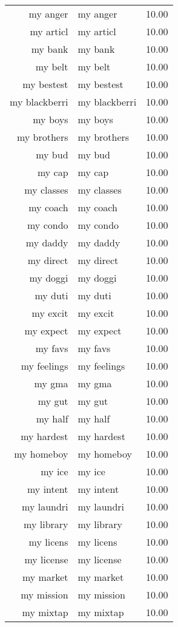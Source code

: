\begin{table}[ht]
\begin{tabular}{rlr}
  my anger & my anger & 10.00 \\ 
  my articl & my articl & 10.00 \\ 
  my bank & my bank & 10.00 \\ 
  my belt & my belt & 10.00 \\ 
  my bestest & my bestest & 10.00 \\ 
  my blackberri & my blackberri & 10.00 \\ 
  my boys & my boys & 10.00 \\ 
  my brothers & my brothers & 10.00 \\ 
  my bud & my bud & 10.00 \\ 
  my cap & my cap & 10.00 \\ 
  my classes & my classes & 10.00 \\ 
  my coach & my coach & 10.00 \\ 
  my condo & my condo & 10.00 \\ 
  my daddy & my daddy & 10.00 \\ 
  my direct & my direct & 10.00 \\ 
  my doggi & my doggi & 10.00 \\ 
  my duti & my duti & 10.00 \\ 
  my excit & my excit & 10.00 \\ 
  my expect & my expect & 10.00 \\ 
  my favs & my favs & 10.00 \\ 
  my feelings & my feelings & 10.00 \\ 
  my gma & my gma & 10.00 \\ 
  my gut & my gut & 10.00 \\ 
  my half & my half & 10.00 \\ 
  my hardest & my hardest & 10.00 \\ 
  my homeboy & my homeboy & 10.00 \\ 
  my ice & my ice & 10.00 \\ 
  my intent & my intent & 10.00 \\ 
  my laundri & my laundri & 10.00 \\ 
  my library & my library & 10.00 \\ 
  my licens & my licens & 10.00 \\ 
  my license & my license & 10.00 \\ 
  my market & my market & 10.00 \\ 
  my mission & my mission & 10.00 \\ 
  my mixtap & my mixtap & 10.00 \\ 

\end{tabular}
\end{table}
